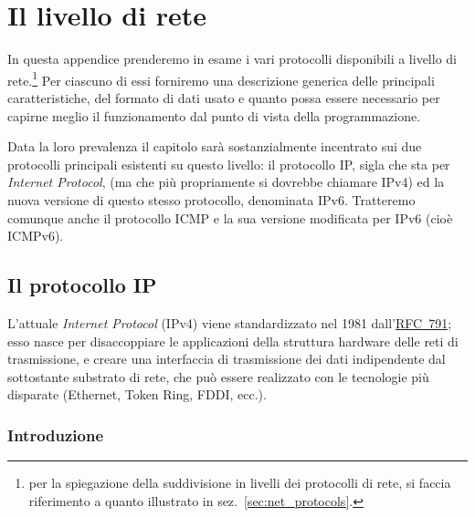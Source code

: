 
\chapter{Il livello di rete}
\label{cha:network_layer}

In questa appendice prenderemo in esame i vari protocolli disponibili a
livello di rete.\footnote{per la spiegazione della suddivisione in livelli dei
  protocolli di rete, si faccia riferimento a quanto illustrato in
  sez.~\ref{sec:net_protocols}.} Per ciascuno di essi forniremo una descrizione
generica delle principali caratteristiche, del formato di dati usato e quanto
possa essere necessario per capirne meglio il funzionamento dal punto di vista
della programmazione.

Data la loro prevalenza il capitolo sarà sostanzialmente incentrato sui due
protocolli principali esistenti su questo livello: il protocollo IP, sigla che
sta per \textit{Internet Protocol}, (ma che più propriamente si dovrebbe
chiamare IPv4) ed la nuova versione di questo stesso protocollo, denominata
IPv6. Tratteremo comunque anche il protocollo ICMP e la sua versione
modificata per IPv6 (cioè ICMPv6).


\section{Il protocollo IP}
\label{sec:ip_protocol}

L'attuale \textit{Internet Protocol} (IPv4) viene standardizzato nel 1981
dall'\href{http://www.ietf.org/rfc/rfc791.txt}{RFC~791}; esso nasce per
disaccoppiare le applicazioni della struttura hardware delle reti di
trasmissione, e creare una interfaccia di trasmissione dei dati indipendente
dal sottostante substrato di rete, che può essere realizzato con le tecnologie
più disparate (Ethernet, Token Ring, FDDI, ecc.).


\subsection{Introduzione}
\label{sec:IP_intro}

